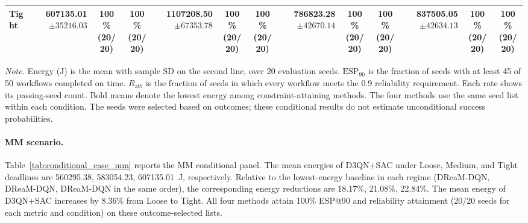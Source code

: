 \documentclass[10pt]{article}
\begin{document}
\begin{table}[!htbp]
\begin{tabular}{@{}l*{4}{rcc}@{}}
Tight & \shortstack[r]{\textbf{607135.01}\\$\pm 35216.03$} & \shortstack[c]{100\%\\(20/20)} & \shortstack[c]{100\%\\(20/20)} & \shortstack[r]{1107208.50\\$\pm 67353.78$} & \shortstack[c]{100\%\\(20/20)} & \shortstack[c]{100\%\\(20/20)} & \shortstack[r]{786823.28\\$\pm 42670.14$} & \shortstack[c]{100\%\\(20/20)} & \shortstack[c]{100\%\\(20/20)} & \shortstack[r]{837505.05\\$\pm 42634.13$} & \shortstack[c]{100\%\\(20/20)} & \shortstack[c]{100\%\\(20/20)} \\
\bottomrule
\end{tabular}
\par\vspace{3pt}
\parbox{\textwidth}{\footnotesize
\textit{Note.} Energy (J) is the mean with sample SD on the second line, over 20 evaluation seeds.
$\mathrm{ESP}_{90}$ is the fraction of seeds with at least 45 of 50 workflows completed on time.
$R_{\mathrm{att}}$ is the fraction of seeds in which every workflow meets the 0.9 reliability requirement.
Each rate shows its passing-seed count. Bold means denote the lowest energy among constraint-attaining methods.
The four methods use the same seed list within each condition.
The seeds were selected based on outcomes; these conditional results do not estimate unconditional success probabilities.}
\endgroup
\end{table}

\paragraph{MM scenario.}
Table~\ref{tab:conditional_case_mm} reports the MM conditional panel. The mean energies of D3QN+SAC under Loose, Medium, and Tight deadlines are 560295.38, 583054.23, 607135.01~J, respectively. Relative to the lowest-energy baseline in each regime (DReaM-DQN, DReaM-DQN, DReaM-DQN in the same order), the corresponding energy reductions are 18.17\%, 21.08\%, 22.84\%. The mean energy of D3QN+SAC increases by 8.36\% from Loose to Tight. All four methods attain 100\% ESP@90 and reliability attainment (20/20 seeds for each metric and condition) on these outcome-selected lists.
\end{document}
